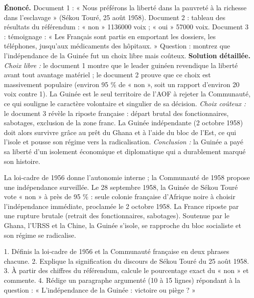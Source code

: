 \documentclass[11pt]{article}
\begin{document}
\begin{exoresolu}
\textbf{Énoncé.} Document 1 : « Nous préférons la liberté dans la pauvreté à la richesse dans l'esclavage » (Sékou Touré, 25 août 1958). Document 2 : tableau des résultats du référendum : « non » \num{1136000} voix ; « oui » \num{57000} voix. Document 3 : témoignage : « Les Français sont partis en emportant les dossiers, les téléphones, jusqu'aux médicaments des hôpitaux. » Question : montrez que l'indépendance de la Guinée fut un choix libre mais coûteux.
\tcblower
\textbf{Solution détaillée.} \emph{Choix libre :} le document 1 montre que le leader guinéen revendique la liberté avant tout avantage matériel ; le document 2 prouve que ce choix est massivement populaire (environ 95 \% de « non », soit un rapport d'environ 20 voix contre 1). La Guinée est le seul territoire de l'AOF à rejeter la Communauté, ce qui souligne le caractère volontaire et singulier de sa décision. \emph{Choix coûteux :} le document 3 révèle la riposte française : départ brutal des fonctionnaires, sabotages, exclusion de la zone franc. La Guinée indépendante (2 octobre 1958) doit alors survivre grâce au prêt du Ghana et à l'aide du bloc de l'Est, ce qui l'isole et pousse son régime vers la radicalisation. \emph{Conclusion :} la Guinée a payé sa liberté d'un isolement économique et diplomatique qui a durablement marqué son histoire.
\end{exoresolu}

\begin{aretenir}
La loi-cadre de 1956 donne l'autonomie interne ; la Communauté de 1958 propose une indépendance surveillée. Le 28 septembre 1958, la Guinée de Sékou Touré vote « non » à près de 95 \% : seule colonie française d'Afrique noire à choisir l'indépendance immédiate, proclamée le 2 octobre 1958. La France riposte par une rupture brutale (retrait des fonctionnaires, sabotages). Soutenue par le Ghana, l'URSS et la Chine, la Guinée s'isole, se rapproche du bloc socialiste et son régime se radicalise.
\end{aretenir}

\begin{exercice}
1. Définis la loi-cadre de 1956 et la Communauté française en deux phrases chacune. 2. Explique la signification du discours de Sékou Touré du 25 août 1958. 3. À partir des chiffres du référendum, calcule le pourcentage exact du « non » et commente. 4. Rédige un paragraphe argumenté (10 à 15 lignes) répondant à la question : « L'indépendance de la Guinée : victoire ou piège ? »
\end{exercice}
\end{document}
